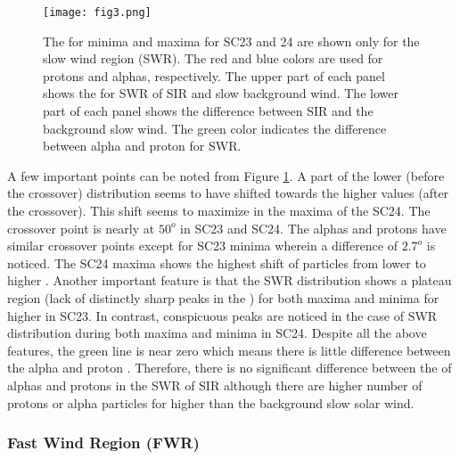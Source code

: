 \documentclass[letters,usenatbib]{mnras}
\begin{document}
\begin{figure}
\begin{center}
\texttt{[image: fig3.png]}
\caption{The   for minima and maxima for SC23 and 24 are shown only for the slow wind region (SWR). The red and blue colors are used for protons and alphas, respectively. The upper part of each panel shows the  for SWR of SIR and slow background wind. The lower part of each panel shows the difference between SIR  and the background slow wind. The green color indicates the difference between alpha and proton  for SWR.      \label{fig:3}}

\end{center}
\end{figure}

A few important points can be noted from Figure \ref{fig:3}. A part of the lower  (before the crossover) distribution seems to have shifted towards the higher values (after the crossover). This shift seems to maximize in the maxima of the SC24. The crossover point is nearly at $50^o$ in SC23 and SC24. The alphas and protons have similar crossover points except for SC23 minima wherein a difference of $2.7^o$ is noticed. The SC24 maxima shows the highest shift of particles from lower   to higher . Another important feature is that the SWR distribution shows a plateau region (lack of distinctly sharp peaks in the ) for both maxima and minima for higher   in SC23. In contrast, conspicuous peaks are noticed in the case of SWR distribution during both maxima and minima in SC24. Despite all the above features, the green line is near zero which means there is little difference between the alpha and proton . Therefore, there is no significant difference between the  of alphas and protons in the SWR of SIR although there are higher number of protons or alpha particles for higher  than the background slow solar wind.

\subsubsection{Fast Wind Region (FWR)}
\end{document}
